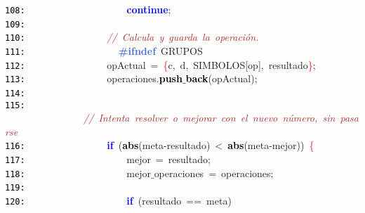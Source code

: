 \documentclass[a4paper,10pt]{scrartcl}
\begin{document}
{   \mbox{}\texttt{\textcolor{Black}{108:}} \ \ \ \ \ \ \ \ \ \ \ \ \ \ \ \ \ \ \ \ \textbf{\textcolor{Blue}{continue}}\textcolor{BrickRed}{;} \\
   \mbox{}\texttt{\textcolor{Black}{109:}} \ \ \ \ \ \ \ \ \ \  \\
   \mbox{}\texttt{\textcolor{Black}{110:}} \ \ \ \ \ \ \ \ \ \ \ \ \ \ \ \ \textit{\textcolor{Brown}{//\ Calcula\ y\ guarda\ la\ operación.}} \\
   \mbox{}\texttt{\textcolor{Black}{111:}} \textbf{\textcolor{RoyalBlue}{\ \ \ \ \ \ \ \ \ \ \ \ \ \ \ \ \#ifndef}}\ GRUPOS\ \ \ \ \ \ \ \ \ \  \\
   \mbox{}\texttt{\textcolor{Black}{112:}} \ \ \ \ \ \ \ \ \ \ \ \ \ \ \ \ opActual\ \textcolor{BrickRed}{=}\ \textcolor{Red}{\{}c\textcolor{BrickRed}{,}\ d\textcolor{BrickRed}{,}\ SIMBOLOS\textcolor{BrickRed}{[}op\textcolor{BrickRed}{],}\ resultado\textcolor{Red}{\}}\textcolor{BrickRed}{;} \\
   \mbox{}\texttt{\textcolor{Black}{113:}} \ \ \ \ \ \ \ \ \ \ \ \ \ \ \ \ operaciones\textcolor{BrickRed}{.}\textbf{\textcolor{Black}{push$\_$back}}\textcolor{BrickRed}{(}opActual\textcolor{BrickRed}{);} \\
   \mbox{}\texttt{\textcolor{Black}{114:}} \ \ \ \ \ \ \ \ \ \ \ \  \\
   \mbox{}\texttt{\textcolor{Black}{115:}} \ \ \ \ \ \ \ \ \ \ \ \ \ \ \ \ \textit{\textcolor{Brown}{//\ Intenta\ resolver\ o\ mejorar\ con\ el\ nuevo\ número,\ sin\ pasarse}} \\
   \mbox{}\texttt{\textcolor{Black}{116:}} \ \ \ \ \ \ \ \ \ \ \ \ \ \ \ \ \textbf{\textcolor{Blue}{if}}\ \textcolor{BrickRed}{(}\textbf{\textcolor{Black}{abs}}\textcolor{BrickRed}{(}meta\textcolor{BrickRed}{-}resultado\textcolor{BrickRed}{)}\ \textcolor{BrickRed}{\textless{}}\ \textbf{\textcolor{Black}{abs}}\textcolor{BrickRed}{(}meta\textcolor{BrickRed}{-}mejor\textcolor{BrickRed}{))}\ \textcolor{Red}{\{} \\
   \mbox{}\texttt{\textcolor{Black}{117:}} \ \ \ \ \ \ \ \ \ \ \ \ \ \ \ \ \ \ \ \ mejor\ \textcolor{BrickRed}{=}\ resultado\textcolor{BrickRed}{;} \\
   \mbox{}\texttt{\textcolor{Black}{118:}} \ \ \ \ \ \ \ \ \ \ \ \ \ \ \ \ \ \ \ \ mejor$\_$operaciones\ \textcolor{BrickRed}{=}\ operaciones\textcolor{BrickRed}{;} \\
   \mbox{}\texttt{\textcolor{Black}{119:}} \ \ \ \ \ \ \ \ \ \  \\
   \mbox{}\texttt{\textcolor{Black}{120:}} \ \ \ \ \ \ \ \ \ \ \ \ \ \ \ \ \ \ \ \ \textbf{\textcolor{Blue}{if}}\ \textcolor{BrickRed}{(}resultado\ \textcolor{BrickRed}{==}\ meta\textcolor{BrickRed}{)} \\
}
\end{document}
